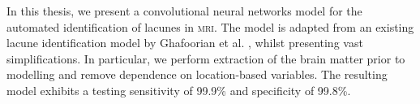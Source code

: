 In this thesis, we present a convolutional neural networks model for the automated identification of lacunes in \textsc{mri}. The model is adapted from an existing lacune identification model by Ghafoorian et al. \cite{GhafoorianM.2017Dml3}, whilst presenting vast simplifications. In particular, we perform extraction of the brain matter prior to modelling and remove dependence on location-based variables. The resulting model exhibits a testing sensitivity of 99.9\% and specificity of 99.8\%.

